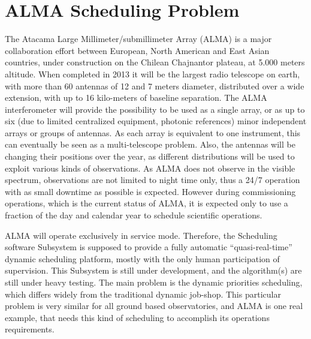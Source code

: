 \section{ALMA Scheduling Problem}
\label{sec:alma-sched-problem}
The Atacama Large Millimeter/submillimeter Array (ALMA) is a major collaboration effort between European, North American and East Asian countries, under construction on the Chilean Chajnantor plateau, at 5.000 meters altitude. When completed in 2013 it will be the largest radio telescope on earth, with more than 60 antennas of 12 and 7 meters diameter, distributed over a wide extension, with up to 16 kilo-meters of baseline separation. The ALMA interferometer will provide the possibility to be used as a single array, or as up to six (due to limited centralized equipment, photonic references) minor independent arrays or groups of antennas. As each array is equivalent to one instrument, this can eventually be seen as a multi-telescope problem. Also, the antennas will be changing their positions over the year, as different distributions will be used to exploit various kinds of observations. As ALMA does not observe in the visible spectrum, observations are not limited to night time only, thus a 24/7 operation with as small downtime as possible is expected. However during commissioning operations, which is the current status of ALMA, it is expected only to use a fraction of the day and calendar year to schedule scientific operations.

ALMA will operate exclusively in service mode. Therefore, the Scheduling software Subsystem is supposed to provide a fully automatic “quasi-real-time” dynamic scheduling platform, mostly with the only human participation of supervision. This Subsystem is still under development, and the algorithm(s) are still under heavy testing. The main problem is the dynamic priorities scheduling, which differs widely from the traditional dynamic job-shop. This particular problem is very similar for all ground based observatories, and ALMA is one real example, that needs this kind of scheduling to accomplish its operations requirements.

